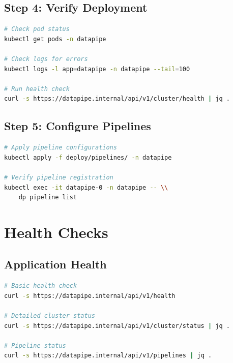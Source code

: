 \documentclass[
    language=english,
    doctype=manual,
    institution=none,
    titlestyle=book,
    oneside,
]{../../omnilatex}
\begin{document}
\section{Step 4: Verify Deployment}

\begin{lstlisting}[language=bash, caption={Verify all pods are running.}]
# Check pod status
kubectl get pods -n datapipe

# Check logs for errors
kubectl logs -l app=datapipe -n datapipe --tail=100

# Run health check
curl -s https://datapipe.internal/api/v1/cluster/health | jq .
\end{lstlisting}

\section{Step 5: Configure Pipelines}

\begin{lstlisting}[language=bash, caption={Register production pipelines.}]
# Apply pipeline configurations
kubectl apply -f deploy/pipelines/ -n datapipe

# Verify pipeline registration
kubectl exec -it datapipe-0 -n datapipe -- \\
    dp pipeline list
\end{lstlisting}

\chapter{Health Checks}
\label{sec:health-checks}

\section{Application Health}

\begin{lstlisting}[language=bash, caption={Application health checks.}]
# Basic health check
curl -s https://datapipe.internal/api/v1/health

# Detailed cluster status
curl -s https://datapipe.internal/api/v1/cluster/status | jq .

# Pipeline status
curl -s https://datapipe.internal/api/v1/pipelines | jq .
\end{lstlisting}
\end{document}
